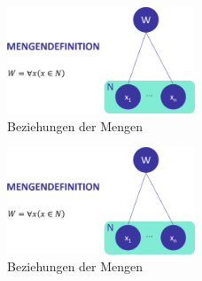 \begin{figure}[h]
\centering
\includegraphics[width=0.5\textwidth]{pictures/toolboxdef}
\caption{Beziehungen der Mengen}
\label{therapiedef}
\end{figure}

\begin{figure}[h]
\centering
\includegraphics[width=0.5\textwidth]{pictures/toolboxdef}
\caption{Beziehungen der Mengen}
\label{therapiedef}
\end{figure}
